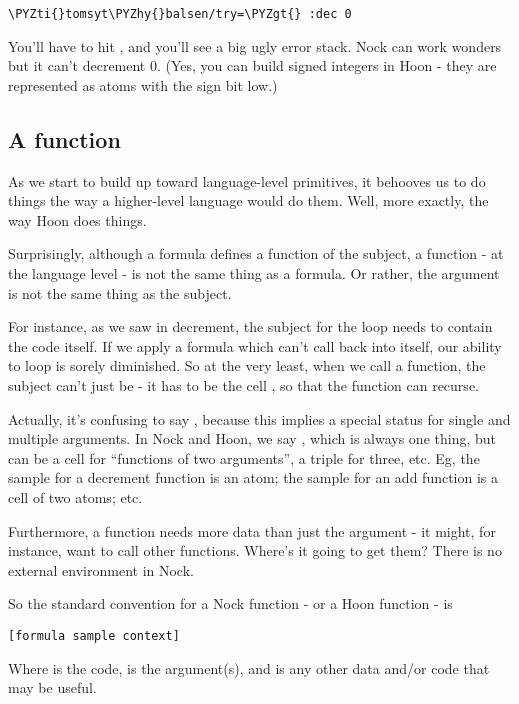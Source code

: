 \begin{framed_shaded}
\begin{Verbatim}[fontsize=\relsize{-2.5},commandchars=\\\{\}]
\PYZti{}tomsyt\PYZhy{}balsen/try=\PYZgt{} :dec 0
\end{Verbatim}
\end{framed_shaded}
You'll have to hit , and you'll see a big ugly error stack.
Nock can work wonders but it can't decrement 0.  (Yes, you can
build signed integers in Hoon - they are represented as atoms
with the sign bit low.)

\subsection{A function}

As we start to build up toward language-level primitives, it
behooves us to do things the way a higher-level language would do
them.  Well, more exactly, the way Hoon does things.

Surprisingly, although a formula defines a function of the
subject, a function - at the language level - is not the same
thing as a formula.  Or rather, the argument is not the same
thing as the subject.

For instance, as we saw in decrement, the subject for the loop
needs to contain the code itself.  If we apply a formula which
can't call back into itself, our ability to loop is sorely
diminished.  So at the very least, when we call a function,
the subject can't just be  - it has to be the cell
, so that the function can recurse.

Actually, it's confusing to say , because this implies
a special status for single and multiple arguments.  In Nock and
Hoon, we say , which is always one thing, but can be a
cell for ``functions of two arguments'', a triple for three, etc.
Eg, the sample for a decrement function is an atom; the sample
for an add function is a cell of two atoms; etc.

Furthermore, a function needs more data than just the argument -
it might, for instance, want to call other functions.  Where's it
going to get them?  There is no external environment in Nock.

So the standard convention for a Nock function - or a Hoon
function - is

\begin{framed_shaded}
\begin{Verbatim}[fontsize=\relsize{-2.5},commandchars=\\\{\}]
[formula sample context]
\end{Verbatim}
\end{framed_shaded}
Where  is the code,  is the argument(s), and
 is any other data and/or code that may be useful.

